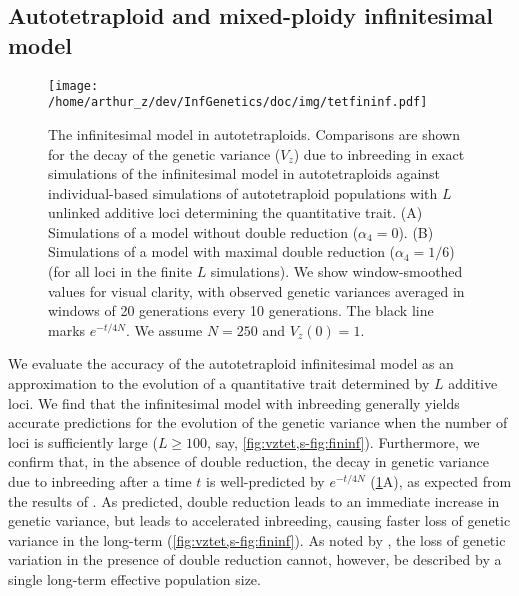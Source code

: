 \documentclass[12pt,a4paper]{article}
\begin{document}
\subsection*{Autotetraploid and mixed-ploidy infinitesimal model}

\begin{figure}[t]
\centering
\texttt{[image: /home/arthur\_z/dev/InfGenetics/doc/img/tetfininf.pdf]}
\caption{
The infinitesimal model in autotetraploids.
Comparisons are shown for the decay of the genetic variance ($V_z$) due to
inbreeding in exact simulations of the infinitesimal model in autotetraploids
against individual-based simulations of autotetraploid populations with $L$
unlinked additive loci determining the quantitative trait. 
(A) Simulations of a model without double reduction ($\alpha_4=0$).
(B) Simulations of a model with maximal double reduction ($\alpha_4=1/6$) (for
all loci in the finite $L$ simulations).
We show window-smoothed values for visual clarity, with observed genetic
variances averaged in windows of 20 generations every 10 generations.
The black line marks $e^{-t/4N}$. 
We assume $N=250$ and $V_z(0) = 1$.
\label{fig:vztet}}
\end{figure}

We evaluate the accuracy of the autotetraploid infinitesimal model as an
approximation to the evolution of a quantitative trait determined by $L$
additive loci.
We find that the infinitesimal model with inbreeding generally yields accurate
predictions for the evolution of the genetic variance when the number of loci
is sufficiently large ($L \ge 100$, say, \cref{fig:vztet,s-fig:fininf}).
Furthermore, we confirm that, in the absence of double reduction, the decay in
genetic variance due to inbreeding after a time $t$ is well-predicted by
$e^{-t/4N}$ (\cref{fig:vztet}A), as expected from the results of \cite{arnold2012}.
As predicted, double reduction leads to an immediate increase in genetic
variance, but leads to accelerated inbreeding, causing faster loss of genetic
variance in the long-term (\cref{fig:vztet,s-fig:fininf}).
As noted by \cite{arnold2012}, the loss of genetic variation in the presence of
double reduction cannot, however, be described by a single long-term effective
population size.
\end{document}
